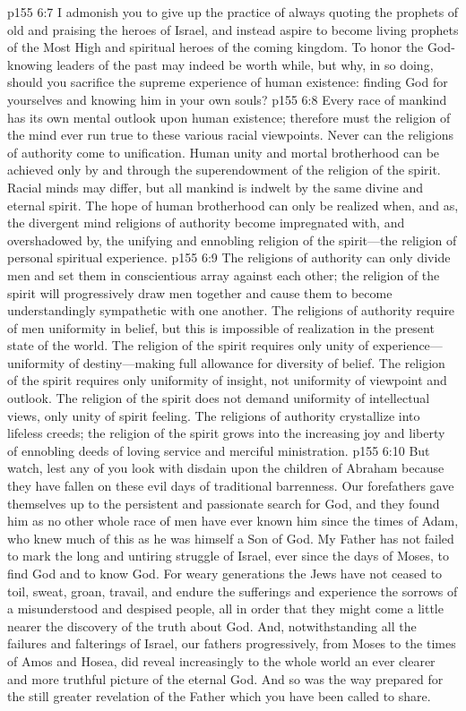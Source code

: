 \vs p155 6:7 \textcolor{ubdarkred}{I admonish you to give up the practice of always quoting the prophets of old and praising the heroes of Israel, and instead aspire to become living prophets of the Most High and spiritual heroes of the coming kingdom. To honor the God\hyp{}knowing leaders of the past may indeed be worth while, but why, in so doing, should you sacrifice the supreme experience of human existence: finding God for yourselves and knowing him in your own souls?}
\vs p155 6:8 \textcolor{ubdarkred}{Every race of mankind has its own mental outlook upon human existence; therefore must the religion of the mind ever run true to these various racial viewpoints. Never can the religions of authority come to unification. Human unity and mortal brotherhood can be achieved only by and through the superendowment of the religion of the spirit. Racial minds may differ, but all mankind is indwelt by the same divine and eternal spirit. The hope of human brotherhood can only be realized when, and as, the divergent mind religions of authority become impregnated with, and overshadowed by, the unifying and ennobling religion of the spirit---the religion of personal spiritual experience.}
\vs p155 6:9 \textcolor{ubdarkred}{The religions of authority can only divide men and set them in conscientious array against each other; the religion of the spirit will progressively draw men together and cause them to become understandingly sympathetic with one another. The religions of authority require of men uniformity in belief, but this is impossible of realization in the present state of the world. The religion of the spirit requires only unity of experience---uniformity of destiny---making full allowance for diversity of belief. The religion of the spirit requires only uniformity of insight, not uniformity of viewpoint and outlook. The religion of the spirit does not demand uniformity of intellectual views, only unity of spirit feeling. The religions of authority crystallize into lifeless creeds; the religion of the spirit grows into the increasing joy and liberty of ennobling deeds of loving service and merciful ministration.}
\vs p155 6:10 \textcolor{ubdarkred}{But watch, lest any of you look with disdain upon the children of Abraham because they have fallen on these evil days of traditional barrenness. Our forefathers gave themselves up to the persistent and passionate search for God, and they found him as no other whole race of men have ever known him since the times of Adam, who knew much of this as he was himself a Son of God. My Father has not failed to mark the long and untiring struggle of Israel, ever since the days of Moses, to find God and to know God. For weary generations the Jews have not ceased to toil, sweat, groan, travail, and endure the sufferings and experience the sorrows of a misunderstood and despised people, all in order that they might come a little nearer the discovery of the truth about God. And, notwithstanding all the failures and falterings of Israel, our fathers progressively, from Moses to the times of Amos and Hosea, did reveal increasingly to the whole world an ever clearer and more truthful picture of the eternal God. And so was the way prepared for the still greater revelation of the Father which you have been called to share.}
